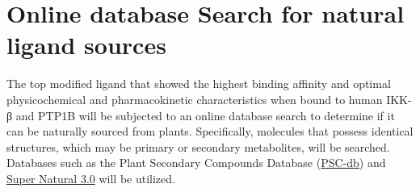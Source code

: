 \section{Online database Search for natural ligand sources}
The top modified ligand that showed the highest binding affinity and optimal physicochemical and pharmacokinetic characteristics when bound to human IKK-β and PTP1B will be subjected to an online database search to determine if it can be naturally sourced from plants. Specifically, molecules that possess identical structures, which may be primary or secondary metabolites, will be searched. Databases such as the Plant Secondary Compounds Database (\href{https://www.ncbi.nlm.nih.gov/pmc/articles/PMC7924326/}{PSC-db}) and \href{https://www.ncbi.nlm.nih.gov/pmc/articles/PMC4384003/}{Super Natural 3.0} will be utilized.  

